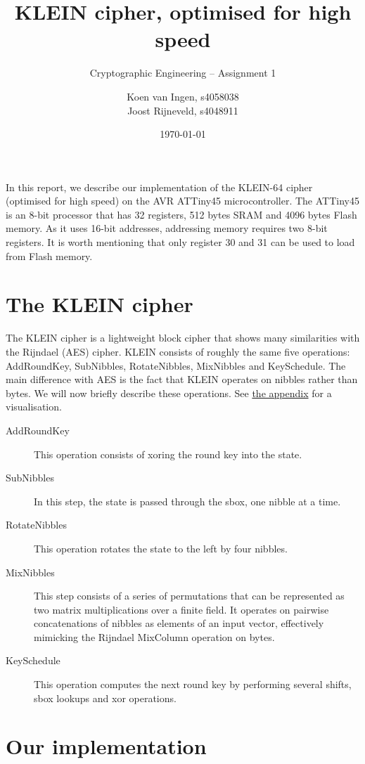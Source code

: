 \documentclass[a4paper]{article}
\title{KLEIN cipher, optimised for high speed}
\subtitle{Cryptographic Engineering -- Assignment 1}
\date{\monthdate\today}
\author{Koen van Ingen, s4058038\\
Joost Rijneveld, s4048911}
\begin{document}
\maketitle

In this report, we describe our implementation of the KLEIN-64 cipher~\cite{gong2012klein} (optimised for high speed) on the AVR ATTiny45 microcontroller. The ATTiny45 is an 8-bit processor that has 32 registers, 512 bytes SRAM and 4096 bytes Flash memory. As it uses 16-bit addresses, addressing memory requires two 8-bit registers. It is worth mentioning that only register 30 and 31 can be used to load from Flash memory.

\section{The KLEIN cipher}

The KLEIN cipher is a lightweight block cipher that shows many similarities with the Rijndael (AES) cipher. KLEIN consists of roughly the same five operations: AddRoundKey, SubNibbles, RotateNibbles, MixNibbles and KeySchedule. The main difference with AES is the fact that KLEIN operates on nibbles rather than bytes. We will now briefly describe these operations. See \hyperlink{appendix}{the appendix} for a visualisation.

\begin{description}
	\item[AddRoundKey] This operation consists of xoring the round key into the state.
	\item[SubNibbles] In this step, the state is passed through the sbox, one nibble at a time.
	\item[RotateNibbles] This operation rotates the state to the left by four nibbles.
	\item[MixNibbles] This step consists of a series of permutations that can be represented as two matrix multiplications over a finite field. It operates on pairwise concatenations of nibbles as elements of an input vector, effectively mimicking the Rijndael MixColumn operation on bytes.
	\item[KeySchedule] This operation computes the next round key by performing several shifts, sbox lookups and xor operations.
\end{description}

\section{Our implementation}
\end{document}
